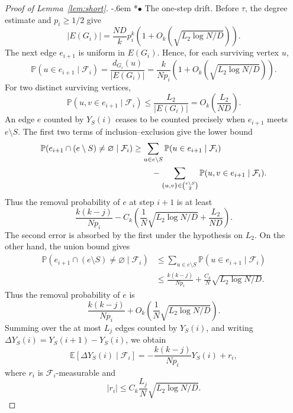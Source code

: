\documentclass[11pt,reqno]{amsart}
\makeatletter
\numberwithin{equation}{section}
\renewcommand{\paragraph}{\@startsection{paragraph}{4}%
    \z@{.75\linespacing\@plus.2\linespacing\@minus.1\linespacing}%
    {-.6em}%
    {\normalfont\bfseries}}
\newcommand{\proofparagraph}[1]{%
    \paragraph*{$\bullet$ #1}\ignorespaces}
\theoremstyle{plain}
\theoremstyle{definition}
\newcommand{\E}{\mathbb E}
\newcommand{\Prob}{\mathbb P}
\makeatother
\begin{document}
\begin{proof}[Proof of Lemma~\ref{lem:short}]
    \proofparagraph{The one-step drift.}
    Before $\tau$, the degree estimate and $p_i\ge1/2$ give
    \[
        |E(G_i)|=\frac{ND}{k}p_i^k
        \left(1+O_k\left(\sqrt{L_2\log N/D}\right)\right).
    \]
    The next edge $e_{i+1}$ is uniform in $E(G_i)$.
    Hence, for each surviving vertex $u$,
    \[
        \Prob(u\in e_{i+1}\mid\mathcal F_i)
        =\frac{d_{G_i}(u)}{|E(G_i)|}
        =\frac{k}{Np_i}\left(1+O_k\left(\sqrt{L_2\log N/D}\right)\right).
    \]
    For two distinct surviving vertices,
    \[
        \Prob(u,v\in e_{i+1}\mid\mathcal F_i)
        \le\frac{L_2}{|E(G_i)|}
        =O_k\left(\frac{L_2}{ND}\right).
    \]
    An edge $e$ counted by $Y_S(i)$ ceases to be counted precisely when $e_{i+1}$ meets $e\setminus S$.
    The first two terms of inclusion--exclusion give the lower bound
    \[
        \begin{aligned}
            \Prob(e_{i+1}\cap(e\setminus S)\ne\varnothing\mid\mathcal F_i)
            &\ge \sum_{u\in e\setminus S}\Prob(u\in e_{i+1}\mid\mathcal F_i)\\
            &\hspace{8mm}-\sum_{\{u,v\}\in\binom{e\setminus S}{2}}
            \Prob(u,v\in e_{i+1}\mid\mathcal F_i).
        \end{aligned}
    \]
    Thus the removal probability of $e$ at step $i+1$ is at least
    \[
        \frac{k(k-j)}{Np_i}
        -C_k\left(\frac1N\sqrt{L_2\log N/D}+\frac{L_2}{ND}\right).
    \]
    The second error is absorbed by the first under the hypothesis on $L_2$.
    On the other hand, the union bound gives
    \allowdisplaybreaks
    \begin{align*}
        \Prob(e_{i+1}\cap(e\setminus S)\ne\varnothing\mid\mathcal F_i)
        &\le \sum_{u\in e\setminus S}\Prob(u\in e_{i+1}\mid\mathcal F_i)\\
        &\le \frac{k(k-j)}{Np_i}
        +\frac{C_k}{N}\sqrt{L_2\log N/D}.
    \end{align*}
    Thus the removal probability of $e$ is
    \[
        \frac{k(k-j)}{Np_i}
        +O_k\left(\frac1N\sqrt{L_2\log N/D}\right).
    \]
    Summing over the at most $L_j$ edges counted by $Y_S(i)$, and writing $\Delta Y_S(i)=Y_S(i+1)-Y_S(i)$, we obtain
    \begin{equation}\label{eq:codegree-drift}
        \E[\Delta Y_S(i)\mid\mathcal F_i]
        =-\frac{k(k-j)}{Np_i}Y_S(i)+r_i,
    \end{equation}
    where $r_i$ is $\mathcal F_i$-measurable and
    \[
        |r_i|\le C_k\frac{L_j}{N}\sqrt{L_2\log N/D}.
    \]


\end{proof}
\end{document}
